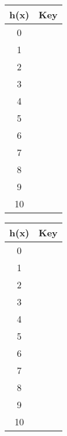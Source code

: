 \begin{tabular}{|c|c|}
\hline
h(x) & Key \\ \hline\hline
0 & \hspace{4cm} \\ \hline
1 & \hspace{4cm} \\ \hline
2 & \hspace{4cm} \\ \hline
3 & \hspace{4cm} \\ \hline
4 & \hspace{4cm} \\ \hline
5 & \hspace{4cm} \\ \hline
6 & \hspace{4cm} \\ \hline
7 & \hspace{4cm} \\ \hline
8 & \hspace{4cm} \\ \hline
9 & \hspace{4cm} \\ \hline
10 & \hspace{4cm} \\ \hline
\end{tabular}
\begin{tabular}{|c|c|}
\hline
h(x) & Key \\ \hline\hline
0 & \hspace{3cm} \\ \hline
1 & \hspace{3cm} \\ \hline
2 & \hspace{3cm} \\ \hline
3 & \hspace{3cm} \\ \hline
4 & \hspace{3cm} \\ \hline
5 & \hspace{3cm} \\ \hline
6 & \hspace{3cm} \\ \hline
7 & \hspace{3cm} \\ \hline
8 & \hspace{3cm} \\ \hline
9 & \hspace{3cm} \\ \hline
10 & \hspace{3cm} \\ \hline
\end{tabular}

